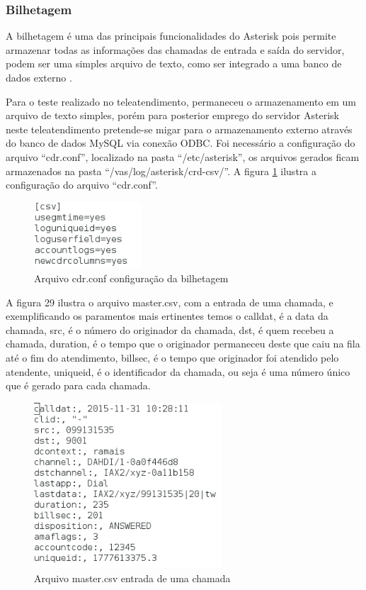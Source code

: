 \subsubsection{Bilhetagem}
A bilhetagem é uma das principais funcionalidades do Asterisk pois permite armazenar todas as informações das chamadas de entrada e saída do servidor, podem ser uma simples arquivo de texto, como ser integrado a uma banco de dados externo \cite{flavioeduardoandredade2005}.

Para o teste realizado no teleatendimento, permaneceu o armazenamento em um arquivo de texto simples, porém para posterior emprego do servidor Asterisk neste teleatendimento pretende-se migar para o armazenamento externo através do banco de dados MySQL via conexão ODBC. Foi necessário a configuração do arquivo ``cdr.conf'', localizado na pasta ``/etc/asterisk'', os arquivos gerados ficam armazenados na pasta ``/vas/log/asterisk/crd-csv/''. A figura \ref{Figura28} ilustra a configuração do arquivo ``cdr.conf''.

\begin{figure}[h]
	\centering
	\includegraphics[width=4cm]{imagens/cdr.png}
	\caption{Arquivo cdr.conf configuração da bilhetagem}
    \label{Figura28}
\end{figure}

A figura 29 ilustra o arquivo master.csv, com a entrada de uma chamada, e exemplificando os paramentos mais ertinentes temos o calldat, é a data da chamada, src, é o número do originador da chamada, dst, é quem recebeu a chamada, duration, é o tempo que o originador permaneceu deste que caiu na fila até o fim do atendimento, billsec, é o tempo que originador foi atendido pelo atendente, uniqueid, é o identificador da chamada, ou seja é uma número único que é gerado para cada chamada.

\begin{figure}[h]
	\centering
	\includegraphics[width=7cm]{imagens/master.png}
	\caption{Arquivo master.csv entrada de uma chamada}
    \label{Figura29}
\end{figure}

